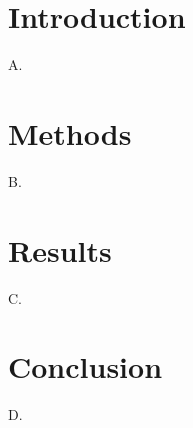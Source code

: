 \documentclass{article}
\begin{document}
\section{Introduction}A.
\section{Methods}B.
\section{Results}C.
\section{Conclusion}D.
\end{document}

